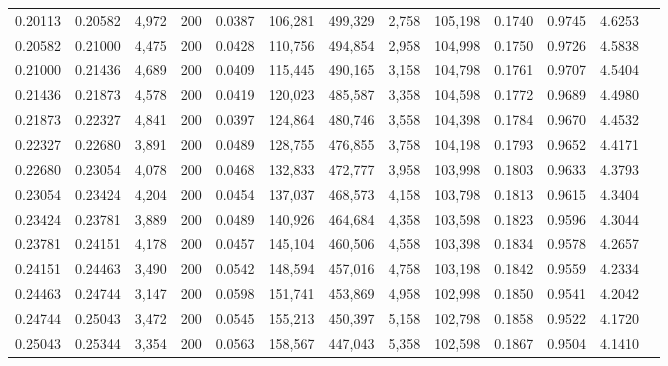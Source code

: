 \begin{tabular}{rrrrrrrrrrrrr}
0.20113 & 0.20582 &  4,972 & 200 &                                     0.0387 & 106,281 & 499,329 &   2,758 & 105,198 & 0.1740 & 0.9745 & 4.6253 \\
0.20582 & 0.21000 &  4,475 & 200 &                                     0.0428 & 110,756 & 494,854 &   2,958 & 104,998 & 0.1750 & 0.9726 & 4.5838 \\
0.21000 & 0.21436 &  4,689 & 200 &                                     0.0409 & 115,445 & 490,165 &   3,158 & 104,798 & 0.1761 & 0.9707 & 4.5404 \\
0.21436 & 0.21873 &  4,578 & 200 &                                     0.0419 & 120,023 & 485,587 &   3,358 & 104,598 & 0.1772 & 0.9689 & 4.4980 \\
0.21873 & 0.22327 &  4,841 & 200 &                                     0.0397 & 124,864 & 480,746 &   3,558 & 104,398 & 0.1784 & 0.9670 & 4.4532 \\
0.22327 & 0.22680 &  3,891 & 200 &                                     0.0489 & 128,755 & 476,855 &   3,758 & 104,198 & 0.1793 & 0.9652 & 4.4171 \\
0.22680 & 0.23054 &  4,078 & 200 &                                     0.0468 & 132,833 & 472,777 &   3,958 & 103,998 & 0.1803 & 0.9633 & 4.3793 \\
0.23054 & 0.23424 &  4,204 & 200 &                                     0.0454 & 137,037 & 468,573 &   4,158 & 103,798 & 0.1813 & 0.9615 & 4.3404 \\
0.23424 & 0.23781 &  3,889 & 200 &                                     0.0489 & 140,926 & 464,684 &   4,358 & 103,598 & 0.1823 & 0.9596 & 4.3044 \\
0.23781 & 0.24151 &  4,178 & 200 &                                     0.0457 & 145,104 & 460,506 &   4,558 & 103,398 & 0.1834 & 0.9578 & 4.2657 \\
0.24151 & 0.24463 &  3,490 & 200 &                                     0.0542 & 148,594 & 457,016 &   4,758 & 103,198 & 0.1842 & 0.9559 & 4.2334 \\
0.24463 & 0.24744 &  3,147 & 200 &                                     0.0598 & 151,741 & 453,869 &   4,958 & 102,998 & 0.1850 & 0.9541 & 4.2042 \\
0.24744 & 0.25043 &  3,472 & 200 &                                     0.0545 & 155,213 & 450,397 &   5,158 & 102,798 & 0.1858 & 0.9522 & 4.1720 \\
0.25043 & 0.25344 &  3,354 & 200 &                                     0.0563 & 158,567 & 447,043 &   5,358 & 102,598 & 0.1867 & 0.9504 & 4.1410 \\

\end{tabular}

